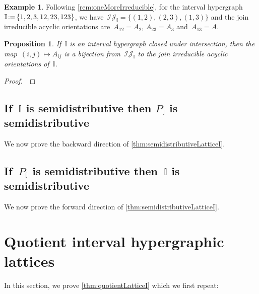\documentclass[reqno]{amsart}
\newtheorem{proposition}[theorem]{Proposition}
\theoremstyle{definition}
\newtheorem{example}[theorem]{Example}
\newcommand{\cal}[1]{\mathcal{#1}} %
\newcommand{\eqdef}{\mbox{\,\raisebox{0.2ex}{\scriptsize\ensuremath{\mathrm:}}\ensuremath{=}\,}} %
\newcommand{\vincent}[1]{\todo[size=\tiny,color=blue!30]{ #1 \\ \hfill --- V.}\,}
\newcommand{\II}{\mathbb I} %
\newcommand{\cIJ}{\cal{IJ}} %
\begin{document}
\begin{example}
Following \cref{rem:oneMoreIrreducible}, for the interval hypergraph~$\II \eqdef \{1, 2, 3, 12, 23, 123\}$, we have~$\cIJ_\II = \{(1,2), (2,3), (1,3)\}$ and the join irreducible acyclic orientations are~$A_{12} = A_2$, $A_{23} = A_3$ and~$A_{13} = A$.
\end{example}

\begin{proposition}
\label{prop:joinIrreducibles}
If~$\II$ is an interval hypergraph closed under intersection, then the map~${(i,j) \mapsto A_{ij}}$ is a bijection from~$\cIJ_\II$ to the join irreducible acyclic orientations of~$\II$.
\end{proposition}

\begin{proof}
\vincent{todo}
\end{proof}


\subsection{If~$\II$ is semidistributive then $P_\II$ is semidistributive}
\label{subsec:semidistributiveLatticeBackward}

We now prove the backward direction of \cref{thm:semidistributiveLatticeI}.


\subsection{If~$P_\II$ is semidistributive then~$\II$ is semidistributive}
\label{subsec:semidistributiveLatticeForward}

We now prove the forward direction of \cref{thm:semidistributiveLatticeI}.


\section{Quotient interval hypergraphic lattices}
\label{sec:quotient}

In this section, we prove \cref{thm:quotientLatticeI} which we first repeat:
\end{document}
